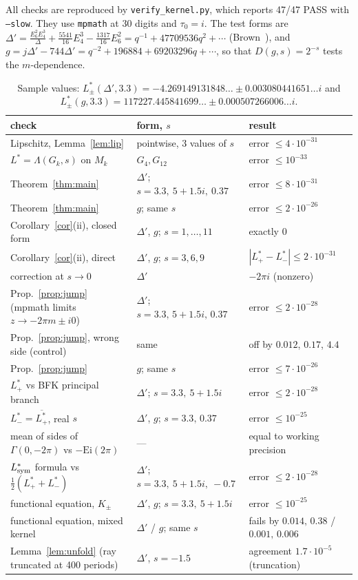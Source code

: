 \documentclass[11pt]{article}
\theoremstyle{definition}
\theoremstyle{remark}
\begin{document}
All checks are reproduced by \texttt{verify\_kernel.py}, which reports 47/47 PASS with
\texttt{--slow}. They use \texttt{mpmath} at 30 digits and $\tau_0=i$. The test forms are
$\Delta'=\frac{E_6^2E_4^3}{\Delta}+\frac{5541}{16}E_4^3-\frac{1317}{16}E_6^2=q^{-1}+47709536q^2+\cdots$
(Brown~\cite{Brown}), and
$g=j\Delta'-744\Delta'=q^{-2}+196884+69203296q+\cdots$, so that $D(g,s)=2^{-s}$ tests the $m$-dependence.

\begin{table}[h]
\centering\footnotesize
\begin{tabular}{@{}lll@{}}
\toprule
check & form, $s$ & result\\\midrule
Lipschitz, Lemma~\ref{lem:lip} & pointwise, 3 values of $s$ & error $\le 4\cdot10^{-31}$\\
$L^*=\Lambda(G_k,s)$ on $M_k$ & $G_4,G_{12}$ & error $\le10^{-33}$\\
Theorem~\ref{thm:main} & $\Delta'$; $s=3.3,\ 5+1.5i,\ 0.37$ & error $\le 8\cdot10^{-31}$\\
Theorem~\ref{thm:main} & $g$; same $s$ & error $\le 2\cdot10^{-26}$\\
Corollary~\ref{cor}(ii), closed form & $\Delta'$, $g$; $s=1,\dots,11$ & exactly $0$\\
Corollary~\ref{cor}(ii), direct & $\Delta'$, $g$; $s=3,6,9$ & $|L^*_+-L^*_-|\le2\cdot10^{-31}$\\
correction at $s\to0$ & $\Delta'$ & $-2\pi i$ (nonzero)\\
Prop.~\ref{prop:jump} (mpmath limits $z\to-2\pi m\pm i0$) & $\Delta'$; $s=3.3,\,5+1.5i,\,0.37$ & error $\le2\cdot10^{-28}$\\
Prop.~\ref{prop:jump}, wrong side (control) & same & off by $0.012$, $0.17$, $4.4$\\
Prop.~\ref{prop:jump} & $g$; same $s$ & error $\le7\cdot10^{-26}$\\
$L^*_+$ vs BFK principal branch & $\Delta'$; $s=3.3,\ 5+1.5i$ & error $\le 2\cdot10^{-28}$\\
$L^*_-=\overline{L^*_+}$, real $s$ & $\Delta'$, $g$; $s=3.3,\,0.37$ & error $\le10^{-25}$\\
mean of sides of $\Gamma(0,-2\pi)$ vs $-\mathrm{Ei}(2\pi)$ & --- & equal to working precision\\
$L^*_{\rm sym}$ formula vs $\tfrac12(L^*_++L^*_-)$ & $\Delta'$; $s=3.3,\ 5+1.5i,\ -0.7$ & error $\le2\cdot10^{-28}$\\
functional equation, $K_\pm$ & $\Delta'$, $g$; $s=3.3,\ 5+1.5i$ & error $\le10^{-25}$\\
functional equation, mixed kernel & $\Delta'$ / $g$; same $s$ & fails by $0.014,\,0.38$ / $0.001,\,0.006$\\
Lemma~\ref{lem:unfold} (ray truncated at 400 periods) & $\Delta'$, $s=-1.5$ & agreement $1.7\cdot10^{-5}$ (truncation)\\
\bottomrule
\end{tabular}
\caption{Sample values: $L^*_\pm(\Delta',3.3)=-4.269149131848\ldots\pm0.003080441651\ldots i$ and
$L^*_\pm(g,3.3)=117227.445841699\ldots\pm0.000507266006\ldots i$.}
\label{tab:num}
\end{table}
\end{document}
